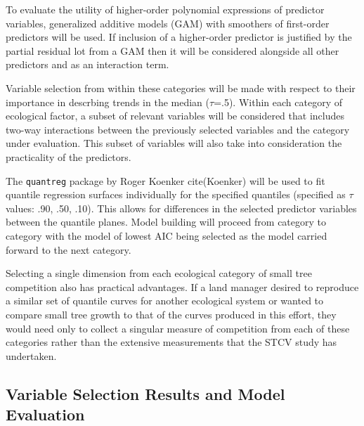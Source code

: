 \documentclass[11pt, letterpaper, fleqn]{article}
\begin{document}
To evaluate the utility of higher-order polynomial expressions of predictor variables, generalized additive models (GAM) with  smoothers of first-order predictors will be used. If inclusion of a higher-order predictor is justified by the partial residual lot from a GAM then it will be considered alongside all other predictors and as an interaction term.

Variable selection from within these categories will be made with respect to their importance in descrbing trends in the median ($\tau$=.5). Within each category of ecological factor, a subset of relevant variables will be considered that includes two-way interactions between the previously selected variables and the category under evaluation. This subset of variables will also take into consideration the practicality of the predictors.

The \texttt{quantreg} package by Roger Koenker cite(Koenker) will be used to fit quantile regression surfaces individually for the specified quantiles (specified as $\tau$ values: .90, .50, .10).  This allows for differences in the selected predictor variables between the quantile planes.
Model building will proceed from category to category with the model of lowest AIC being selected as the model carried forward to the next category. 


Selecting a single dimension from each ecological category of small tree competition also has practical advantages.  If a land manager desired to reproduce a similar set of quantile curves for another ecological system or wanted to compare small tree growth to that of the curves produced in this effort, they would need only to collect a singular measure of competition from each of these categories rather than the extensive measurements that the STCV study has undertaken.

\newpage
\subsection{Variable Selection Results and Model Evaluation}
\end{document}
